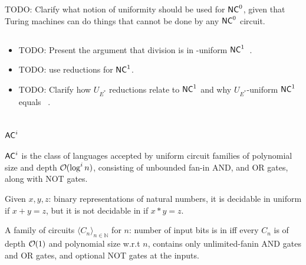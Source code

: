 TODO: Clarify what notion of uniformity should be used for $\mathsf{NC}^{0}$, given that  Turing machines can do things that cannot be done by
any $\mathsf{NC}^{0}$ circuit.
\subsection{}
\begin{itemize}
\item TODO: Present the argument that division is in -uniform $\mathsf{NC}^{1}$~\cite{ITA_2001__35_3_259_0}.
\item TODO: use  reductions for $\mathsf{NC}^{1}$.
\item TODO: Clarify how $U_{E^*}$ reductions relate to $\mathsf{NC}^{1}$ and why $U_{E^*}$-uniform $\mathsf{NC}^{1}$ equals ~\cite{RUZZO1981365}.
\end{itemize}


\section{\texorpdfstring{$\mathsf{AC}^{i}$}{AC\string^i}}
$\mathsf{AC}^{i}$ is the class of languages accepted by uniform circuit
families of polynomial size and depth $\bigO(\log^i n)$, consisting of unbounded fan-in
AND, and OR gates, along with NOT gates.

Given $x, y, z$: binary representations of natural numbers,
it is decidable in uniform  if $x + y = z$, but it is not decidable 
in  if $x * y = z$.

A family of circuits $\langle C_n \rangle_{n \in \mathbb{N}}$ for $n$:
number of input bits is in  iff every $C_n$ is of depth $\bigO(1)$ and polynomial 
size w.r.t $n$, contains only unlimited-fanin AND gates and OR gates, and optional 
NOT gates at the inputs. 

